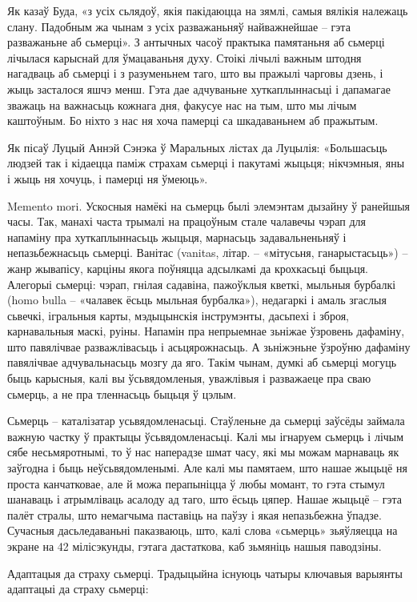 Як казаў Буда, «з усіх сьлядоў, якія пакідаюцца на зямлі, самыя вялікія належаць слану. Падобным жа чынам з усіх разважаньняў найважнейшае – гэта разважаньне аб сьмерці». З антычных часоў практыка памятаньня аб сьмерці лічылася карыснай для ўмацаваньня духу. Стоікі лічылі важным штодня нагадваць аб сьмерці і з разуменьнем таго, што вы пражылі чарговы дзень, і жыць засталося яшчэ менш. Гэта дае адчуваньне хуткаплыннасьці і дапамагае зважаць на важнасьць кожнага дня, факусуе нас на тым, што мы лічым каштоўным. Бо ніхто з нас ня хоча памерці са шкадаваньнем аб пражытым.

Як пісаў Луцый Аннэй Сэнэка ў Маральных лістах да Луцылія: «Большасьць людзей так і кідаецца паміж страхам сьмерці і пакутамі жыцьця; нікчэмныя, яны і жыць ня хочуць, і памерці ня ўмеюць».

Memento mori. Ускосныя намёкі на сьмерць былі элемэнтам дызайну ў ранейшыя часы. Так, манахі часта трымалі на працоўным стале чалавечы чэрап для напаміну пра хуткаплыннасьць жыцьця, марнасьць задавальненьняў і непазьбежнасьць сьмерці. Ванітас (vanitas, літар. – «мітусьня, ганарыстасьць») – жанр жывапісу, карціны якога поўняцца адсылкамі да крохкасьці быцьця. Алегорыі сьмерці: чэрап, гнілая садавіна, пажоўклыя кветкі, мыльныя бурбалкі (homo bulla – «чалавек ёсьць мыльная бурбалка»), недагаркі і амаль згаслыя сьвечкі, ігральныя карты, мэдыцынскія інструмэнты, дасьпехі і зброя, карнавальныя маскі, руіны. Напамін пра непрыемнае зьніжае ўзровень дафаміну, што павялічвае разважлівасьць і асьцярожнасьць. А зьніжэньне ўзроўню дафаміну павялічвае адчувальнасьць мозгу да яго. Такім чынам, думкі аб сьмерці могуць быць карысныя, калі вы ўсьвядомленыя, уважлівыя і разважаеце пра сваю сьмерць, а не пра тленнасьць быцьця ў цэлым.

Сьмерць – каталізатар усьвядомленасьці. Стаўленьне да сьмерці заўсёды займала важную частку ў практыцы ўсьвядомленасьці. Калі мы ігнаруем сьмерць і лічым сябе несьмяротнымі, то ў нас наперадзе шмат часу, які мы можам марнаваць як заўгодна і быць неўсьвядомленымі. Але калі мы памятаем, што нашае жыцьцё ня проста канчатковае, але й можа перапыніцца ў любы момант, то гэта стымул шанаваць і атрымліваць асалоду ад таго, што ёсьць цяпер. Нашае жыцьцё – гэта палёт стралы, што немагчыма паставіць на паўзу і якая непазьбежна ўпадзе. Сучасныя дасьледаваньні паказваюць, што, калі слова «сьмерць» зьяўляецца на экране на 42 мілісэкунды, гэтага дастаткова, каб зьмяніць нашыя паводзіны. 

Адаптацыя да страху сьмерці. Традыцыйна існуюць чатыры ключавыя варыянты адаптацыі да страху сьмерці: 

